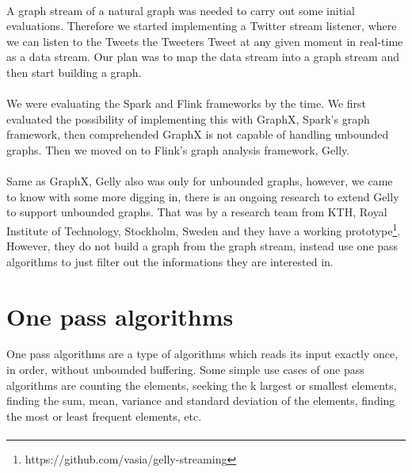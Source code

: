 \documentclass[12pt]{report}
\numberwithin{figure}{section}
\numberwithin{table}{section}
\begin{document}
\paragraph{}

A graph stream of a natural graph was needed to carry out some initial evaluations. Therefore we started implementing a Twitter stream listener, where we can listen to the Tweets the Tweeters Tweet at any given moment in real-time as a data stream. Our plan was to map the data stream into a graph stream and then start building a graph. 

\paragraph{}

We were evaluating the Spark and Flink frameworks by the time. We first evaluated the possibility of implementing this with GraphX, Spark’s graph framework, then comprehended GraphX is not capable of handling unbounded graphs. Then we moved on to Flink’s graph analysis framework, Gelly. 

\paragraph{}

Same as GraphX, Gelly also was only for unbounded graphs, however, we came to know with some more digging in, there is an ongoing research\cite{Kalavri} to extend Gelly to support unbounded graphs. That was by a research team from KTH, Royal Institute of Technology, Stockholm, Sweden and they have a working prototype\footnote{https://github.com/vasia/gelly-streaming}. However, they do not build a graph from the graph stream, instead use one pass algorithms to just filter out the informations they are interested in. 


\section{One pass algorithms}

One pass algorithms are a type of algorithms which reads its input exactly once, in order, without unbounded buffering. Some simple use cases of one pass algorithms are counting the elements, seeking the k largest or smallest elements, finding the sum, mean, variance and standard deviation of the elements, finding the most or least frequent elements, etc. 

\paragraph{}
\end{document}
